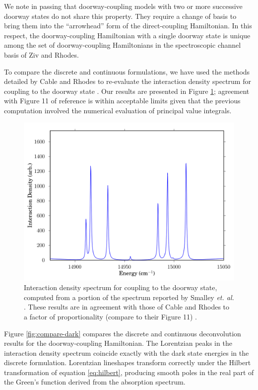 \documentclass[12pt]{mitthesis}
\begin{document}
We note in passing that doorway-coupling models with two or more
successive doorway states do not share this property.  They require a
change of basis to bring them into the ``arrowhead'' form of the
direct-coupling Hamiltonian.  In this respect, the doorway-coupling
Hamiltonian with a single doorway state is unique among the set of
doorway-coupling Hamiltonians in the spectroscopic channel basis of
Ziv and Rhodes.

To compare the discrete and continuous formulations, we have used the
methods detailed by Cable and Rhodes to re-evaluate the interaction
density spectrum for coupling to the doorway state \cite{cable80}.
Our results are presented in Figure \ref{fig:ids}; agreement with
Figure 11 of reference \cite{cable80} is within acceptable limits
given that the previous computation involved the numerical evaluation
of principal value integrals.

\begin{figure}
  \caption{Interaction density spectrum for coupling to the doorway
    state, computed from a portion of the  spectrum reported
    by Smalley \emph{et. al.}  \cite{smalley75}.  These results are in
    agreement with those of Cable and Rhodes to a factor of
    proportionality (compare to their Figure 11) \cite{cable80}. }
  \label{fig:ids}
  \centering
  \includegraphics[width=5in]{smalley-ids1.png}
\end{figure}

Figure \ref{fig:compare-dark} compares the discrete and continuous
deconvolution results for the doorway-coupling Hamiltonian.  The
Lorentzian peaks in the interaction density spectrum coincide exactly
with the dark state energies in the discrete formulation.  Lorentzian
lineshapes transform correctly under the Hilbert transformation of
equation \ref{eq:hilbert}, producing smooth poles in the real part of
the Green's function derived from the absorption spectrum.  
\end{document}
